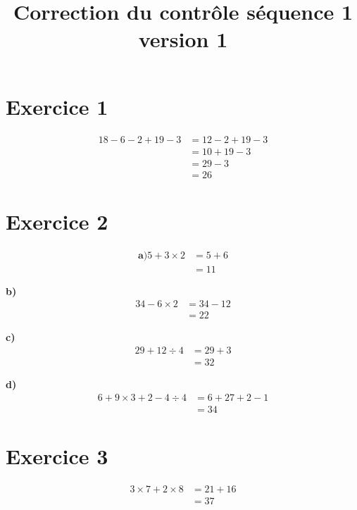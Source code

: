\documentclass[12pt]{extarticle}
\title{\textbf{Correction du contrôle séquence 1 version 1}}
\author{}
\date{}
\begin{document}
\maketitle

\section*{Exercice 1}
\begin{align*}
18 - 6 - 2 + 19 - 3 &= 12 - 2 + 19 - 3 \\
                     &= 10 + 19 - 3 \\
                     &= 29 - 3 \\
                     &= 26
\end{align*}

\section*{Exercice 2}

\begin{align*}
\textbf{a)}
5 + 3 \times 2 &= 5 + 6 \\
               &= 11
\end{align*}

\textbf{b)}
\begin{align*}
34 - 6 \times 2 &= 34 - 12 \\
                &= 22
\end{align*}

\textbf{c)}
\begin{align*}
29 + 12 \div 4 &= 29 + 3 \\
               &= 32
\end{align*}

\textbf{d)}
\begin{align*}
6 + 9 \times 3 + 2 - 4 \div 4 &= 6 + 27 + 2 - 1 \\
                              &= 34
\end{align*}

\section*{Exercice 3}
\begin{align*}
3 \times 7 + 2 \times 8 &= 21 + 16 \\
                        &= 37
\end{align*}
\end{document}
